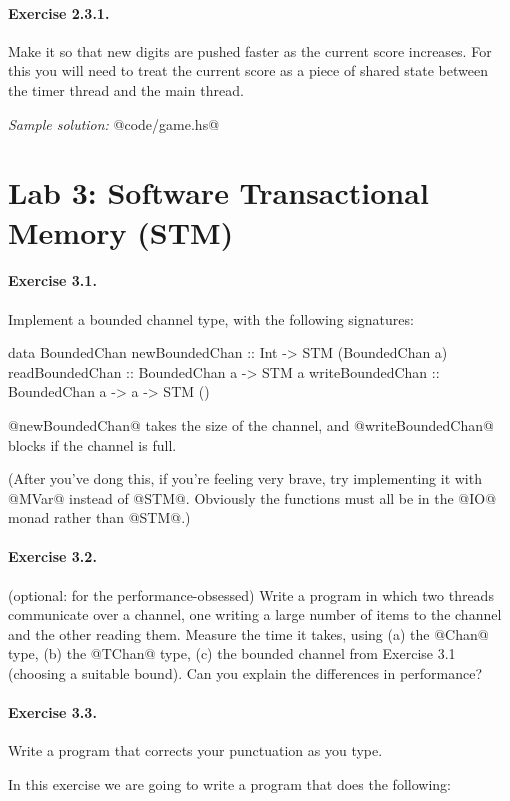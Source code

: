 \documentclass[11pt,a4paper]{article}
\newcommand{\Section}[2]{\section{#2}\label{sec:#1}}
\begin{document}
\paragraph{Exercise 2.3.1.} Make it so that new digits are pushed
faster as the current score increases.  For this you will need to
treat the current score as a piece of shared state between the timer
thread and the main thread.

\emph{Sample solution:} @code/game.hs@

\newpage\Section{stm}{Lab 3: Software Transactional Memory (STM)}

\paragraph{Exercise 3.1.} Implement a bounded channel type, with the
following signatures:

\begin{haskell}
data BoundedChan
newBoundedChan   :: Int -> STM (BoundedChan a)
readBoundedChan  :: BoundedChan a -> STM a
writeBoundedChan :: BoundedChan a -> a -> STM ()
\end{haskell}

\noindent @newBoundedChan@ takes the size of the channel, and
@writeBoundedChan@ blocks if the channel is full.

(After you've dong this, if you're feeling very brave, try implementing it
with @MVar@ instead of @STM@.  Obviously the functions must all be in
the @IO@ monad rather than @STM@.)

\paragraph{Exercise 3.2.} (optional: for the performance-obsessed)
Write a program in which two threads communicate over a channel, one
writing a large number of items to the channel and the other reading
them.  Measure the time it takes, using (a) the @Chan@ type, (b) the
@TChan@ type, (c) the bounded channel from Exercise 3.1 (choosing a
suitable bound).  Can you explain the differences in performance?

\paragraph{Exercise 3.3.} Write a program that corrects your
punctuation as you type.

In this exercise we are going to write a program that does the following:
\end{document}
